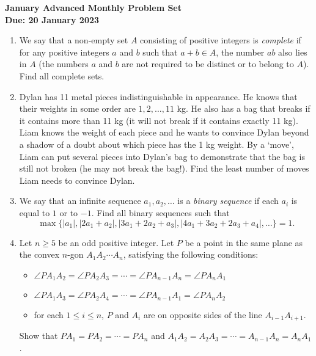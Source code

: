 \documentclass{article}
\newcommand{\abs}[1]{\left|#1\right|}
\begin{document}
\thispagestyle{empty}

\begin{center}
  \textbf{\Large January Advanced Monthly Problem Set}
  \\ \vspace{1em}
  \textbf{\large Due: 20 January 2023}
\end{center}

\bigskip

\begin{enumerate}[itemsep=\fill]

 
\item %
We say that a non-empty set $A$ consisting of positive integers is \textit{complete} if for any positive integers $a$ and $b$ such that $a+b\in A$, the number $ab$ also lies in $A$ (the numbers $a$ and $b$ are not required to be distinct or to belong to $A$). Find all complete sets.


\item %
Dylan has 11 metal pieces indistinguishable in appearance.
He knows that their weights in some order are $1,2,\dotsc,11$ kg.
He also has a bag that breaks if it contains more than 11 kg (it will not break if it contains exactly 11 kg).
Liam knows the weight of each piece and he wants to convince Dylan beyond a shadow of a doubt about which piece has the 1 kg weight.
By a `move', Liam can put several pieces into Dylan's bag to demonstrate that the bag is still not broken (he may not break the bag!).
Find the least number of moves Liam needs to convince Dylan.


\item %
We say that an infinite sequence $a_1, a_2, \dotsc$ is a \emph{binary sequence} if each $a_i$ is equal to $1$ or to $-1$.
Find all binary sequences such that \[ \max\{\abs{a_1}, \abs{2a_1+a_2}, \abs{3a_1+2a_2+a_3}, \abs{4a_1+3a_2+2a_3+a_4}, \dotsc\} = 1. \]


\item %
Let $n \geq 5$ be an odd positive integer.
Let $P$ be a point in the same plane as the convex $n$-gon $A_1 A_2 \dotsm A_n$, satisfying the following conditions:
\begin{itemize}
	\item $\angle PA_1A_2 = \angle PA_2A_3 = \dotsb = \angle PA_{n-1}A_n = \angle PA_nA_1$
  \item $\angle PA_1A_3 =\angle PA_2A_4 = \dotsb = \angle PA_{n-1}A_1 = \angle PA_nA_2$
  \item for each $1\leq i\leq n$, $P$ and $A_i$ are on opposite sides of the line $A_{i-1}A_{i+1}$.
\end{itemize}
Show that $PA_1 = PA_2 = \dotsb = PA_n$ and $A_1A_2 = A_2A_3 = \dotsb = A_{n-1}A_n = A_nA_1$.



\end{enumerate}
\end{document}
